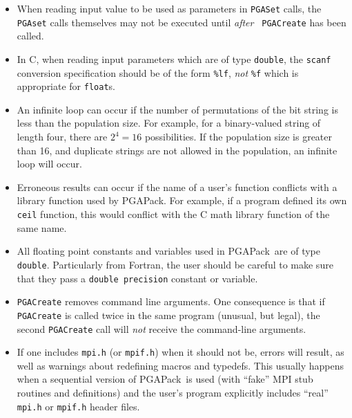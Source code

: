 \documentclass{report}
\newcommand{\pga}{PGAPack}
\begin{document}
\begin{itemize}

\item When reading input value to be used as parameters in {\tt PGASet} calls,
the {\tt PGAset} calls themselves may not be executed until {\em after} {\tt
PGACreate} has been called.

\item In C, when reading input parameters which are of type {\tt double}, the
{\tt scanf} conversion specification should be of the form
{\tt \%lf}, {\em not } {\tt \%f} which is appropriate for {\tt float}s.


\item 
An infinite loop can occur if the number of permutations
of the bit string is less than the population size.  For example, for a
binary-valued string of length four, there are $2^4 = 16$ possibilities.  If
the population size is greater than 16, and duplicate strings are not allowed
in the population, an infinite loop will occur.

\item Erroneous results can occur if
the name of a user's function conflicts with a library function used by \pga.
For example, if a program defined its own {\tt ceil} function, this would
conflict with the C math library function of the same name.

\item All floating point constants and variables used in \pga\ are 
of type {\tt double}.  Particularly from Fortran,
the user should be careful to make sure that they pass 
a {\tt double precision} constant or variable.

\item {\tt PGACreate} removes command line arguments.  One
consequence is that if {\tt PGACreate} is called twice in the same program
(unusual, but legal), the second {\tt PGACreate} call will {\em not} receive
the command-line arguments.

\item If one includes {\tt mpi.h} (or {\tt mpif.h}) when it should not be,
errors will result, as well as warnings about redefining macros and typedefs.
This usually happens when a sequential version of \pga\ is used (with ``fake''
MPI stub routines and definitions) and the user's program explicitly includes
``real'' {\tt mpi.h} or {\tt mpif.h} header files.


\end{itemize}
\end{document}
